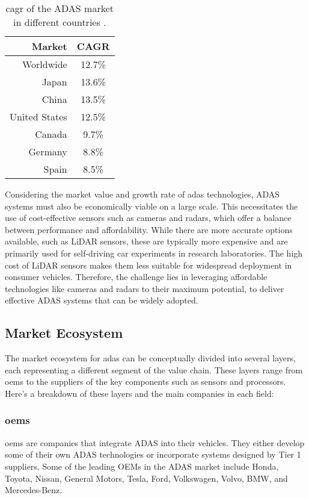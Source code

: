 \begin{table}[h]
    \centering
    \begin{tabular}{r|c}
        \hline
        \textbf{Market} & \textbf{CAGR} \\
        \hline
        Worldwide & 12.7\% \\
        Japan & 13.6\% \\
        China & 13.5\% \\
        United States & 12.5\% \\
        Canada & 9.7\% \\
        Germany & 8.8\% \\
        Spain & 8.5\% \\
        \hline
    \end{tabular}
    \caption[CAGR of the ADAS market in different countries]
    {\ac{cagr} of the ADAS market in different countries \cite{adas_report_2023}.}
    \label{tab:adas_revenue}
\end{table}
Considering the market value and growth rate of \ac{adas} technologies, 
ADAS systems must also be economically viable on a large scale. 
This necessitates the use of cost-effective sensors such as cameras and radars, 
which offer a balance between performance and affordability. While there are 
more accurate options available, such as LiDAR sensors, these are typically more 
expensive and are primarily used for self-driving car experiments in research 
laboratories. The high cost of LiDAR sensors makes them less suitable for 
widespread deployment in consumer vehicles. Therefore, the challenge lies in 
leveraging affordable technologies like cameras and radars to their maximum 
potential, to deliver effective ADAS systems that can be widely adopted.

\subsection{Market Ecosystem}
The market ecosystem for \ac{adas} can be 
conceptually divided into several layers, each representing a different segment 
of the value chain. These layers range from \ac*{oems} to the suppliers of the key 
components such as sensors and processors. 
Here's a breakdown of these layers and the main companies in each field:

\subsubsection{\ac{oems}}
\acl{oems} are companies that integrate ADAS into their vehicles. They either develop 
some of their own ADAS technologies or incorporate systems designed by 
Tier 1 suppliers. Some of the leading OEMs in the ADAS market include 
Honda, Toyota, Nissan, General Motors, Tesla, Ford, Volkswagen, Volvo, BMW, and 
Mercedes-Benz.

